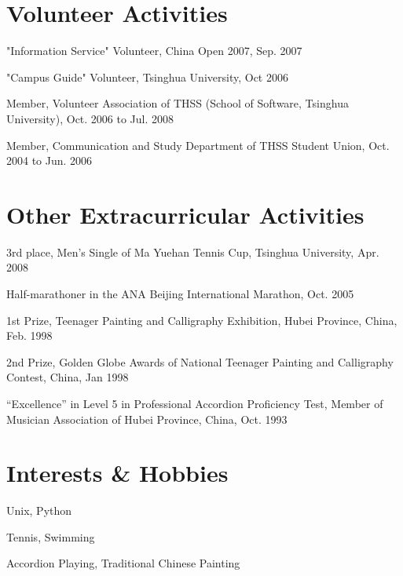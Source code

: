 \documentclass[10pt,letterpaper]{article}
\renewenvironment{itemize}{
  \begin{list}{}{
    \setlength{\leftmargin}{1.5em}
    \setlength{\itemsep}{0.25em}
    \setlength{\parskip}{0pt}
    \setlength{\parsep}{0.25em}
  }
}{
  \end{list}
}
\begin{document}
\section*{Volunteer Activities}
\begin{itemize}
\item "Information Service" Volunteer, China Open 2007, Sep. 2007
\item "Campus Guide" Volunteer, Tsinghua University, Oct 2006
\item Member, Volunteer Association of THSS (School of Software, Tsinghua University), Oct. 2006 to Jul. 2008
\item Member, Communication and Study Department of THSS Student Union, Oct. 2004 to Jun. 2006
\end{itemize}

\section*{Other Extracurricular Activities}
\begin{itemize}
\item 3rd place, Men's Single of Ma Yuehan Tennis Cup, Tsinghua University, Apr. 2008
\item Half-marathoner in the ANA Beijing International Marathon, Oct. 2005
\item 1st Prize, Teenager Painting and Calligraphy Exhibition, Hubei Province, China, Feb. 1998
\item 2nd Prize, Golden Globe Awards of National Teenager Painting and Calligraphy Contest, China, Jan 1998
\item ``Excellence'' in Level 5 in Professional Accordion Proficiency Test, Member of Musician Association of Hubei Province, China, Oct. 1993
\end{itemize}

\section*{Interests \& Hobbies}
\begin{itemize}
\item Unix, Python
\item Tennis, Swimming
\item Accordion Playing, Traditional Chinese Painting
\end{itemize}
\end{document}
